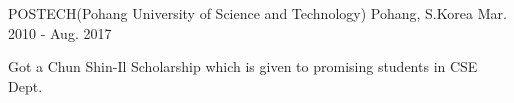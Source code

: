 

\begin{cventries}

		{POSTECH(Pohang University of Science and Technology)} %
		{Pohang, S.Korea} %
		{Mar. 2010 - Aug. 2017} %
		{
			\begin{cvitems} %
				\item {Got a Chun Shin-Il Scholarship which is given to promising students in CSE Dept.}
			\end{cvitems}
		}

\end{cventries}
